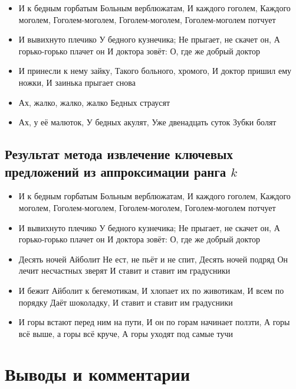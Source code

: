 \begin{itemize}
  \item И к бедным горбатым Больным верблюжатам, И каждого гоголем, Каждого моголем, Гоголем-моголем, Гоголем-моголем, Гоголем-моголем потчует
  \item И вывихнуто плечико У бедного кузнечика; Не прыгает, не скачет он, А горько-горько плачет он И доктора зовёт: О, где же добрый доктор
  \item И принесли к нему зайку, Такого больного, хромого, И доктор пришил ему ножки, И заинька прыгает снова
  \item Ах, жалко, жалко, жалко Бедных страусят
  \item Ах, у её малюток, У бедных акулят, Уже двенадцать суток Зубки болят
\end{itemize}



\subsection{Результат метода извлечение ключевых предложений из аппроксимации ранга $k$}

\begin{itemize}
  \item И к бедным горбатым Больным верблюжатам, И каждого гоголем, Каждого моголем, Гоголем-моголем, Гоголем-моголем, Гоголем-моголем потчует
  \item И вывихнуто плечико У бедного кузнечика; Не прыгает, не скачет он, А горько-горько плачет он И доктора зовёт: О, где же добрый доктор
  \item Десять ночей Айболит Не ест, не пьёт и не спит, Десять ночей подряд Он лечит несчастных зверят И ставит и ставит им градусники
  \item И бежит Айболит к бегемотикам, И хлопает их по животикам, И всем по порядку Даёт шоколадку, И ставит и ставит им градусники
  \item И горы встают перед ним на пути, И он по горам начинает ползти, А горы всё выше, а горы всё круче, А горы уходят под самые тучи
\end{itemize}




\newpage





\section{Выводы и комментарии}

